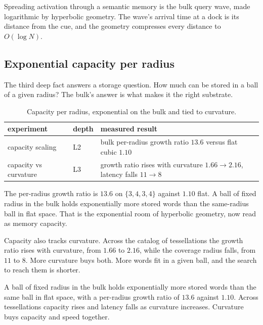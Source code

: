 \begin{principle}
Spreading activation through a semantic memory is the bulk query wave, made logarithmic by hyperbolic geometry. The wave's arrival time at a dock is its distance from the cue, and the geometry compresses every distance to $O(\log N)$.
\end{principle}

\subsection{Exponential capacity per radius}

The third deep fact answers a storage question. How much can be stored in a ball of a given radius? The bulk's answer is what makes it the right substrate.

\begin{table}[ht]
\centering
\begin{tabular}{@{}lll@{}}
\toprule
experiment & depth & measured result \\
\midrule
capacity scaling & L2 & bulk per-radius growth ratio $13.6$ versus flat cubic $1.10$ \\
capacity vs curvature & L3 & growth ratio rises with curvature $1.66 \to 2.16$, latency falls $11 \to 8$ \\
\bottomrule
\end{tabular}
\caption{Capacity per radius, exponential on the bulk and tied to curvature.}
\label{tab:capacity}
\end{table}

The per-radius growth ratio is $13.6$ on $\{3,4,3,4\}$ against $1.10$ flat. A ball of fixed radius in the bulk holds exponentially more stored words than the same-radius ball in flat space. That is the exponential room of hyperbolic geometry, now read as memory capacity.

Capacity also tracks curvature. Across the catalog of tessellations the growth ratio rises with curvature, from $1.66$ to $2.16$, while the coverage radius falls, from $11$ to $8$. More curvature buys both. More words fit in a given ball, and the search to reach them is shorter.

\begin{result}
A ball of fixed radius in the bulk holds exponentially more stored words than the same ball in flat space, with a per-radius growth ratio of $13.6$ against $1.10$. Across tessellations capacity rises and latency falls as curvature increases. Curvature buys capacity and speed together.
\end{result}

